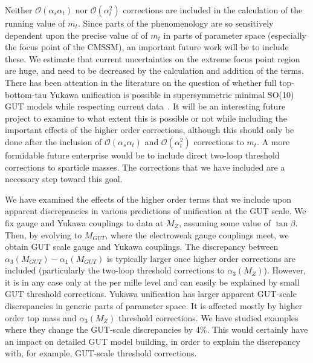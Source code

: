 \documentclass[final,3p,times,pdflatex]{elsarticle}
\begin{document}
 Neither $\mathcal O(\alpha_s \alpha_t) $ nor $\mathcal O(\alpha_t^2)$
 corrections are included in the calculation of the running value of
 $m_t$. Since parts of the phenomenology are so 
 sensitively dependent upon the precise value of of $m_t$ in parts of
 parameter space (especially the focus point of the CMSSM), an important
 future work will be to include these. We estimate that current uncertainties
 on the extreme focus point region are huge, and need to be decreased by the
 calculation and addition of the terms. 
 There has been attention in the literature 
 on the question of whether full top-bottom-tau Yukawa
 unification is possible in supersymmetric minimal SO(10) GUT
 models while respecting current
 data~\cite{Blazek:2002ta,Altmannshofer:2008vr,Anandakrishnan:2014nea}.  
 It will be an interesting future project to examine to what extent this is
 possible or not while including the important effects of the higher order
 corrections, although this should only be done after the inclusion of
 $\mathcal O(\alpha_s \alpha_t) $ and $\mathcal O(\alpha_t^2)$ corrections to
 $m_t$. 
 A more formidable future enterprise would
 be to  include direct two-loop threshold corrections to sparticle masses. The
 corrections that we have included are a necessary step toward this goal. 

 We have examined the effects of the higher order terms that we include
 upon apparent discrepancies in various predictions of unification at the GUT
 scale. We fix gauge and Yukawa couplings to data at $M_Z$, assuming some
 value of $\tan \beta$. Then, by evolving to $M_{GUT}$, where the electroweak
 gauge couplings meet, we obtain GUT scale gauge and Yukawa couplings. The
 discrepancy between $\alpha_3(M_{GUT})-\alpha_1(M_{GUT})$ is typically larger 
 once higher order corrections are included (particularly the two-loop
 threshold corrections to $\alpha_3(M_Z)$). However, it is in any case only at
 the per mille level and can easily be explained by small GUT threshold
 corrections. Yukawa unification has larger apparent GUT-scale discrepancies in
 generic parts of parameter space. It is affected mostly by higher order top
 mass and $\alpha_3(M_Z)$ threshold corrections. We have studied examples
 where they change the GUT-scale
 discrepancies by 4$\%$. This would certainly have an impact on detailed GUT
 model building, in order to explain the discrepancy with, for example,
 GUT-scale  threshold corrections. 
 
\end{document}
